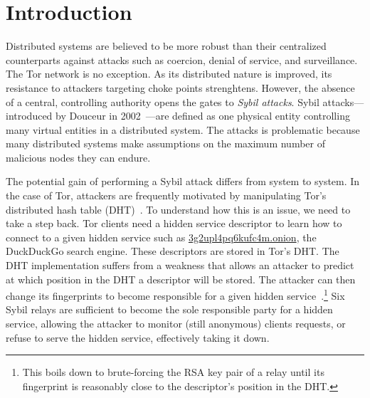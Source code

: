 \section{Introduction}
\label{sec:introduction}

Distributed systems are believed to be more robust than their centralized
counterparts against attacks such as coercion, denial of service, and
surveillance.  The Tor network is no exception.  As its distributed nature is
improved, its resistance to attackers targeting choke points strenghtens.
However, the absence of a central, controlling authority opens the gates to
\emph{Sybil attacks}.  Sybil attacks---introduced by Douceur in
2002~\cite{Douceur2002a}---are defined as one physical entity controlling many
virtual entities in a distributed system.  The attacks is problematic because
many distributed systems make assumptions on the maximum number of malicious
nodes they can endure.

The potential gain of performing a Sybil attack differs from system to system.
In the case of Tor, attackers are frequently motivated by manipulating Tor's
distributed hash table (DHT)~\cite{rendspec}.  To understand how this is an
issue, we need to take a step back.  Tor clients need a hidden service
descriptor to learn how to connect to a given hidden service such as
\url{3g2upl4pq6kufc4m.onion}, the DuckDuckGo search engine.  These descriptors
are stored in Tor's DHT.  The DHT implementation suffers from a weakness that
allows an attacker to predict at which position in the DHT a descriptor will be
stored.  The attacker can then change its fingerprints to become responsible
for a given hidden service~\cite{Biryukov2013a}.\footnote{This boils down to
brute-forcing the RSA key pair of a relay until its fingerprint is reasonably
close to the descriptor's position in the DHT.}  Six Sybil relays are
sufficient to become the sole responsible party for a hidden service, allowing
the attacker to monitor (still anonymous) clients requests, or refuse to serve
the hidden service, effectively taking it down.

